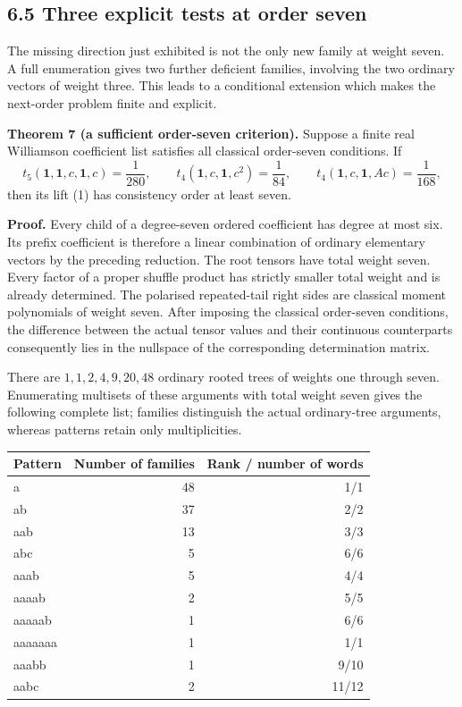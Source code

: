 \documentclass[
  11pt,
  a4paper,
]{scrartcl}
\newcounter{none} %
\begin{document}
\subsection{6.5 Three explicit tests at order
seven}\label{three-explicit-tests-at-order-seven}

The missing direction just exhibited is not the only new family at
weight seven. A full enumeration gives two further deficient families,
involving the two ordinary vectors of weight three. This leads to a
conditional extension which makes the next-order problem finite and
explicit.

\textbf{Theorem 7 (a sufficient order-seven criterion).} Suppose a
finite real Williamson coefficient list satisfies all classical
order-seven conditions. If \[
t_5(\mathbf1,\mathbf1,c,\mathbf1,c)=\frac1{280},\qquad
t_4(\mathbf1,c,\mathbf1,c^2)=\frac1{84},\qquad
t_4(\mathbf1,c,\mathbf1,Ac)=\frac1{168},
\tag{C7+}
\] then its lift (1) has consistency order at least seven.

\textbf{Proof.} Every child of a degree-seven ordered coefficient has
degree at most six. Its prefix coefficient is therefore a linear
combination of ordinary elementary vectors by the preceding reduction.
The root tensors have total weight seven. Every factor of a proper
shuffle product has strictly smaller total weight and is already
determined. The polarised repeated-tail right sides are classical moment
polynomials of weight seven. After imposing the classical order-seven
conditions, the difference between the actual tensor values and their
continuous counterparts consequently lies in the nullspace of the
corresponding determination matrix.

There are \(1,1,2,4,9,20,48\) ordinary rooted trees of weights one
through seven. Enumerating multisets of these arguments with total
weight seven gives the following complete list; families distinguish the
actual ordinary-tree arguments, whereas patterns retain only
multiplicities.


{\def\LTcaptype{none} %
\begin{longtable}[]{@{}lrr@{}}
\toprule\noalign{}
Pattern & Number of families & Rank / number of words \\
\midrule\noalign{}
\endhead
\bottomrule\noalign{}
\endlastfoot
a & 48 & 1/1 \\
ab & 37 & 2/2 \\
aab & 13 & 3/3 \\
abc & 5 & 6/6 \\
aaab & 5 & 4/4 \\
aaaab & 2 & 5/5 \\
aaaaab & 1 & 6/6 \\
aaaaaaa & 1 & 1/1 \\
aaabb & 1 & 9/10 \\
aabc & 2 & 11/12 \\
\end{longtable}
}
\end{document}
